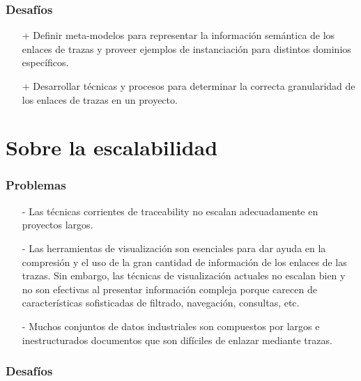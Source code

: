 \documentclass[a4paper,12pt,oneside,spanish]{book}
\begin{document}
\subsubsection{Desafíos}

\begin{itemize}

\item[+] Definir meta-modelos para representar la información semántica de los enlaces de trazas y proveer ejemplos de instanciación para distintos dominios específicos.

\item[+] Desarrollar técnicas y procesos para determinar la correcta granularidad de los enlaces de trazas en un proyecto.

\end{itemize}

\section{Sobre la escalabilidad}

\subsubsection{Problemas}

\begin{itemize}

\item[-] Las técnicas corrientes de traceability no escalan adecuadamente en proyectos largos.

\item[-] Las herramientas de visualización son esenciales para dar ayuda en la compresión y el uso de la gran cantidad de información de los enlaces de las trazas. Sin embargo, las técnicas de visualización actuales no escalan bien y no son efectivas al presentar información compleja porque carecen de características sofisticadas de filtrado, navegación, consultas, etc.

\item[-] Muchos conjuntos de datos industriales son compuestos por largos e inestructurados documentos que son difíciles de enlazar mediante trazas.
\end{itemize}

\subsubsection{Desafíos}
\end{document}
